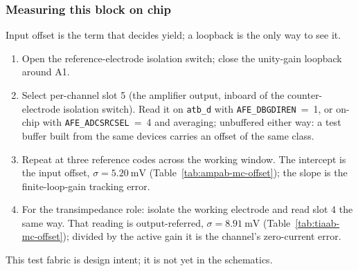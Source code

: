 %

\subsubsection{Measuring this block on chip}

Input offset is the term that decides yield; a loopback is the only way to see
it.
\begin{enumerate}[nosep]
\item Open the reference-electrode isolation switch; close the unity-gain
  loopback around A1.
\item Select per-channel slot 5 (the amplifier output, inboard of the
  counter-electrode isolation switch). Read it on \texttt{atb\_d} with
  \texttt{AFE\_DBGDIREN}~=~1, or on-chip with \texttt{AFE\_ADCSRCSEL}~=~4 and
  averaging; unbuffered either way: a test buffer built from the same
  devices carries an offset of the same class.
\item Repeat at three reference codes across the working window. The intercept
  is the input offset, \(\sigma = \SI{5.20}{\milli\volt}\)
  (Table~\ref{tab:ampab-mc-offset}); the slope is the finite-loop-gain
  tracking error.
\item For the transimpedance role: isolate the working electrode and read
  slot 4 the same way. That reading is output-referred,
  \(\sigma = \SI{8.91}{\milli\volt}\) (Table~\ref{tab:tiaab-mc-offset});
  divided by the active gain it is the channel's zero-current error.
\end{enumerate}
This test fabric is design intent; it is not yet in the schematics.
